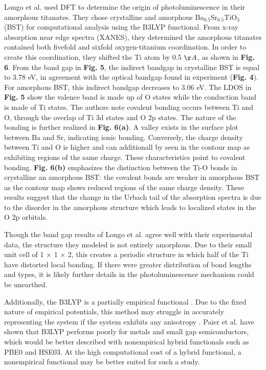 \documentclass[3p,review,12pt]{elsarticle}
\begin{document}
Longo et al. \cite{Longo2004} used DFT to determine the origin of photoluminescence in their amorphous titanates. They chose  crystalline and amorphous Ba$_{0.5}$Sr$_{0.5}$TiO$_{3}$ (BST) for computational analysis using the B3LYP functional. From x-ray absorption near edge spectra (XANES), they determined the amorphous titanates contained both fivefold and sixfold oxygen-titanium coordination. In order to create this coordination, they shifted the Ti atom by 0.5 $\AA$, as shown in \textbf{Fig. 6}. From the band gap in \textbf{Fig. 5}, the indirect bandgap in crystalline BST is equal to 3.78 eV, in agreement with the optical bandgap found in experiment (\textbf{Fig. 4}). For amorphous BST, this indirect bandgap decreases to 3.06 eV. The LDOS in \textbf{Fig. 5} show the valence band is made up of O states while the conduction band is made of Ti states. The authors note covalent bonding occurs between Ti and O, through the overlap of Ti 3d states and O 2p states. The nature of the bonding is further realized in \textbf{Fig. 6(a)}. A  valley exists in the surface plot between Ba and Sr, indicating ionic bonding. Conversely, the charge density between Ti and O is higher and can additionall by seen in the contour map as exhibiting regions of the same charge. These characteristics point to covalent bonding.\textbf{ Fig. 6(b)} emphasizes the distinction between the Ti-O bonds in crystalline an amorphous BST: the covalent bonds are weaker in amorphous BST as the contour map shows reduced regions of the same charge density. These results suggest that the change in the Urbach tail of the absorption spectra is due to the disorder in the amorphous structure which leads to localized states in the O 2p orbitals.

\par

Though the band gap results of Longo et al. agree well with their experimental data, the structure they modeled is not entirely amorphous. Due to their small unit cell of 1 $\times$ 1 $\times$ 2, this creates a periodic structure in which half of the Ti have distorted local bonding. If there were greater distribution of bond lengths and types, it is likely further details in the photoluminescence mechanism could be unearthed.
\par

Additionally, the B3LYP is a partially empirical functional \cite{Paier2007}. Due to the fixed nature of empirical potentials, this method may struggle in accurately representing the system if the system exhibits any anisotropy \cite{Hohl1991}. Paier et al. \cite{Paier2007} have shown that B3LYP performs poorly for metals and small gap semiconductors, which would be better described with nonempirical hybrid functionals such as PBE0 and HSE03. At the high computational cost of a hybrid functional, a nonempirical functional may be better suited for such a study.
\end{document}
